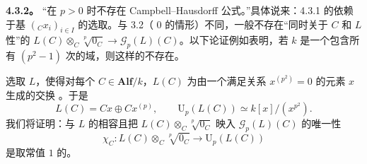 \textbf{4.3.2。} “在 $p>0$ 时不存在 Campbell--Hausdorff 公式。”具体说来：4.3.1 的依赖于基 $({}_Cx_i)_{i\in I}$ 的选取。与 3.2（ $0$ 的情形）不同，一般不存在“同时关于 $C$ 和 $L$ 性”的 $L(C)\otimes_C\sqrt[p]{0_C}\to\mathscr G_p(L)(C)$。以下论证例如表明，若 $k$ 是一个包含所有 $(p^2-1)$ 次的域，则这样的不存在。

选取 $L$，使得对每个 $C\in\mathbf{Alf}/k$，$L(C)$ 为由一个满足关系 $x^{(p^2)}=0$ 的元素 $x$ 生成的交换 。于是
\[
L(C)=Cx\oplus Cx^{(p)},\qquad\mathrm U_p(L(C))\simeq k[x]/(x^{p^2}).
\]
我们将证明：与 $L$ 的相容且把 $L(C)\otimes_C\sqrt[p]{0_C}$ 映入 $\mathscr G_p(L)(C)$ 的唯一性
\[\chi_C:L(C)\otimes_C\sqrt[p]{0_C}\longrightarrow\mathrm U_p(L(C))\]
是取常值 $1$ 的。

